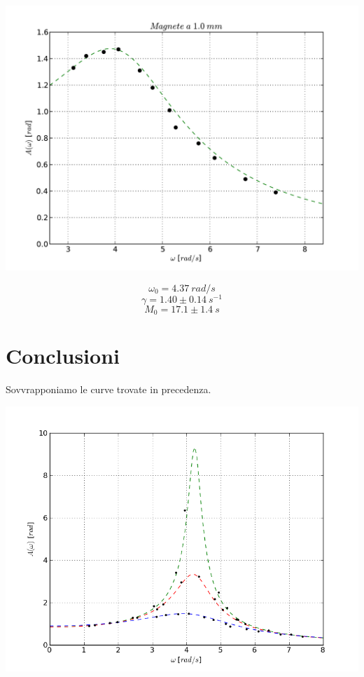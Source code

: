 \includegraphics[scale=0.75]{"../grafici/Magnetea10mm"}


$$ \omega_0 = 4.37\ rad/s $$
$$ \gamma = 1.40 \pm 0.14\ s^{-1}$$
$$ M_0 = 17.1 \pm 1.4\ s$$


\section{Conclusioni}

Sovvrapponiamo le curve trovate in precedenza.

\includegraphics[scale=0.9]{../grafici/risonanza}


